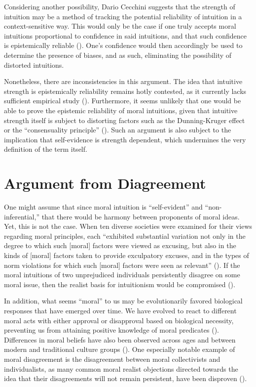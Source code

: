 \documentclass[12pt, a4paper, twoside]{article}
\begin{document}
Considering another possibility, Dario Cecchini suggests that the strength of intuition may be a method of tracking the potential reliability of intuition in a context-sensitive way. This would only be the case if one truly accepts moral intuitions proportional to confidence in said intuitions, and that such confidence is epistemically reliable (\cite[p.\ 11]{cecchini2024reliability}). One’s confidence would then accordingly be used to determine the presence of biases, and as such, eliminating the possibility of distorted intuitions. 

Nonetheless, there are inconsistencies in this argument. The idea that intuitive strength is epistemically reliability remains hotly contested, as it currently lacks sufficient empirical study (\cite[p.\ 22]{cecchini2024reliability}). Furthermore, it seems unlikely that one would be able to prove the epistemic reliability of moral intuitions, given that intuitive strength itself is subject to distorting factors such as the Dunning-Kruger effect or the “consensuality principle” (\cites[pp.\ 23–24]{cecchini2024reliability}[pp.\ 259–262]{dunning2011kruger}{koriat2012self}). Such an argument is also subject to the implication that self-evidence is strength dependent, which undermines the very definition of the term itself. 

\section{Argument from Diagreement}

One might assume that since moral intuition is “self-evident” and “non-inferential,” that there would be harmony between proponents of moral ideas. Yet, this is not the case. When ten diverse societies were examined for their views regarding moral principles, each “exhibited substantial variation not only in the degree to which such [moral] factors were viewed as excusing, but also in the kinds of [moral] factors taken to provide exculpatory excuses, and in the types of norm violations for which such [moral] factors were seen as relevant” (\cite[p.\ 4692]{barrett2016small}). If the moral intuitions of two unprejudiced individuals persistently disagree on some moral issue, then the realist basis for intuitionism would be compromised (\cites[pp.\ 208–210]{sidgwick1907methods}[p.\ 44]{shaferlandau2004good}).

In addition, what seems “moral” to us may be evolutionarily favored biological responses that have emerged over time. We have evolved to react to different moral acts with either approval or disapproval based on biological necessity, preventing us from attaining positive knowledge of moral predicates (\cites[p.\ 348]{singer2009ethics}[p.\ 72]{joyce2007evolution}{morton2016new}). Differences in moral beliefs have also been observed across ages and between modern and traditional culture groups (\cite{nisan1987moral}). One especially notable example of moral disagreement is the disagreement between moral collectivists and individualists, as many common moral realist objections directed towards the idea that their disagreements will not remain persistent, have been disproven (\cite[pp.\ 855–864]{goldman2022right}).
\end{document}
